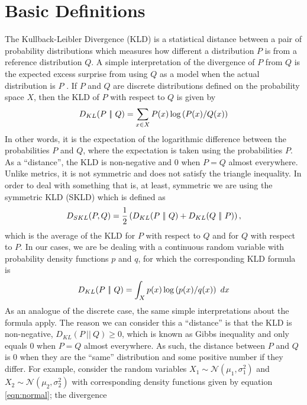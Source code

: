 \section{Basic Definitions}
The Kullback-Leibler Divergence (KLD) is a statistical distance between a 
pair of probability distributions which measures how different a distribution $P$ is 
from a reference distribution $Q$. A simple interpretation of the 
divergence of $P$ from $Q$ is the expected excess surprise from using $Q$ as a model 
when the actual distribution is $P$ \cite{kullback}. If $P$ and $Q$ are discrete distributions 
defined on the probability space $X$, then the KLD of $P$ with 
respect to $Q$ is given by
\begin{equation}
    D_{KL}(P\ |\!|\ Q) = \sum_{x \in X}P(x)\log\left(P(x)/Q(x)\right) \label{eqn:discrete KLD}
\end{equation}
In other words, it is the expectation of the logarithmic difference between the 
probabilities $P$ and $Q$, where the expectation is taken using the probabilities 
$P$. As a ``distance'', the KLD is non-negative and 0 when $P = Q$ almost
everywhere. Unlike metrics, it is not symmetric and does not satisfy 
the triangle inequality. In order to deal with something that is, at least, symmetric 
we are using the symmetric KLD (SKLD) which is defined as 
\begin{equation}
    D_{SKL}(P, Q) = \frac{1}{2}\left(D_{KL}(P\ |\!|\ Q) + D_{KL}(Q\ |\!|\ P)\right),
\end{equation}
which is the average of the KLD for $P$ with respect to $Q$ and for $Q$
with respect to $P$. In our cases, we are be dealing with a continuous random variable
with probability density functions $p$ and $q$, for which the corresponding KLD formula 
is
\begin{equation}
    D_{KL}(P\ |\!|\ Q) = \int_X p(x)\log\left(p(x)/q(x)\right)\ dx \label{eqn:continuous KLD}
\end{equation}
As an analogue of the discrete case, the same simple interpretations about
the formula apply. The reason we can consider this a ``distance'' is that the KLD 
is non-negative, $D_{KL}(P\ |\!|\ Q) \geq 0$, which is known as Gibbs 
inequality and only equals 0 when $P = Q$ almost everywhere. As such, the distance
between $P$ and $Q$ is 0 when they are the ``same'' distribution and some positive 
number if they differ. For example, consider the random variables $X_1 \sim 
\mathcal{N}(\mu_1, \sigma_1^2)$ and $X_2 \sim \mathcal{N}(\mu_2, \sigma_2^2)$ 
with corresponding density functions given by equation \ref{eqn:normal}; the divergence 

